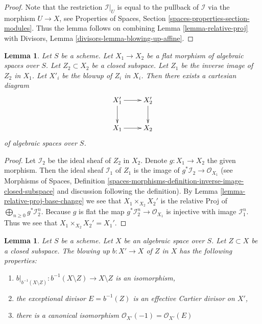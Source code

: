 \documentclass{stacks-project}
\theoremstyle{plain}
\newtheorem{lemma}[subsection]{Lemma}
\theoremstyle{definition}
\theoremstyle{remark}
\numberwithin{equation}{subsection}
\begin{document}
\begin{proof}
Note that the restriction $\mathcal{I}|_U$ is equal to the pullback
of $\mathcal{I}$ via the morphism $U \to X$, see
Properties of Spaces, Section \ref{spaces-properties-section-modules}.
Thus the lemma follows on combining Lemma \ref{lemma-relative-proj} with
Divisors, Lemma \ref{divisors-lemma-blowing-up-affine}.
\end{proof}

\begin{lemma}
\label{lemma-flat-base-change-blowing-up}
Let $S$ be a scheme.
Let $X_1 \to X_2$ be a flat morphism of algebraic spaces over $S$.
Let $Z_2 \subset X_2$ be a closed subspace.
Let $Z_1$ be the inverse image of $Z_2$ in $X_1$.
Let $X'_i$ be the blowup of $Z_i$ in $X_i$. Then there exists a cartesian
diagram
$$
\xymatrix{
X_1' \ar[r] \ar[d] & X_2' \ar[d] \\
X_1 \ar[r] & X_2
}
$$
of algebraic spaces over $S$.
\end{lemma}

\begin{proof}
Let $\mathcal{I}_2$ be the ideal sheaf of $Z_2$ in $X_2$.
Denote $g : X_1 \to X_2$ the given morphism. Then the ideal sheaf
$\mathcal{I}_1$ of $Z_1$ is the image of
$g^*\mathcal{I}_2 \to \mathcal{O}_{X_1}$
(see Morphisms of Spaces, Definition
\ref{spaces-morphisms-definition-inverse-image-closed-subspace}
and discussion following the definition).
By Lemma \ref{lemma-relative-proj-base-change}
we see that $X_1 \times_{X_2} X_2'$ is the relative Proj of
$\bigoplus_{n \geq 0} g^*\mathcal{I}_2^n$. Because $g$ is flat the map
$g^*\mathcal{I}_2^n \to \mathcal{O}_{X_1}$ is injective with image
$\mathcal{I}_1^n$. Thus we see that $X_1 \times_{X_2} X_2' = X_1'$.
\end{proof}

\begin{lemma}
\label{lemma-blowing-up-gives-effective-Cartier-divisor}
Let $S$ be a scheme. Let $X$ be an algebraic space over $S$.
Let $Z \subset X$ be a closed subspace.
The blowing up $b : X' \to X$ of $Z$ in $X$
has the following properties:
\begin{enumerate}
\item $b|_{b^{-1}(X \setminus Z)} : b^{-1}(X \setminus Z) \to X \setminus Z$
is an isomorphism,
\item the exceptional divisor $E = b^{-1}(Z)$ is an effective Cartier divisor
on $X'$,
\item there is a canonical isomorphism
$\mathcal{O}_{X'}(-1) = \mathcal{O}_{X'}(E)$
\end{enumerate}
\end{lemma}
\end{document}
